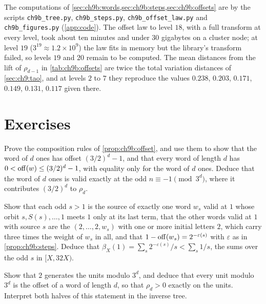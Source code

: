 \begin{sloppypar}The computations of \cref{sec:ch9b:words,sec:ch9b:steps,sec:ch9b:offsets} are by the scripts \texttt{ch9b\_tree.py}, \texttt{ch9b\_steps.py}, \texttt{ch9b\_offset\_law.py} and \texttt{ch9b\_figures.py} (\cref{app:code}). The offset law to level $18$, with a full transform at every level, took about ten minutes and under $30$ gigabytes on a cluster node; at level $19$ ($3^{19}\approx1.2\times10^9$) the law fits in memory but the library's transform failed, so levels $19$ and $20$ remain to be computed. The mean distances from the lift of $\rho_{d-1}$ in \cref{tab:ch9b:offsets} are twice the total variation distances of \cref{sec:ch9:tao}, and at levels $2$ to $7$ they reproduce the values $0.238$, $0.203$, $0.171$, $0.149$, $0.131$, $0.117$ given there.\end{sloppypar}

\section*{Exercises}

\begin{exercise}\label{ex:ch9b:ones}
Prove the composition rules of \cref{prop:ch9b:offset}, and use them to show that the word of $d$ ones has offset $(3/2)^d-1$, and that every word of length $d$ has $0<\operatorname{off}(w)\le(3/2)^d-1$, with equality only for the word of $d$ ones. Deduce that the word of $d$ ones is valid exactly at the odd $n\equiv-1\pmod{3^d}$, where it contributes $(3/2)^d$ to $\rho_d$.
\end{exercise}

\begin{exercise}\label{ex:ch9b:targetone}
Show that each odd $s>1$ is the source of exactly one word $w_s$ valid at $1$ whose orbit $s,S(s),\ldots,1$ meets $1$ only at its last term, that the other words valid at $1$ with source $s$ are the $(2,\ldots,2,w_s)$ with one or more initial letters $2$, which carry three times the weight of $w_s$ in all, and that $1-\operatorname{off}(w_s)=2^{-\varepsilon(s)}$ with $\varepsilon$ as in \cref{prop:ch9b:steps}. Deduce that $\beta_X(1)=\sum_s2^{-\varepsilon(s)}/s<\sum_s1/s$, the sums over the odd $s$ in $[X,32X)$.
\end{exercise}

\begin{exercise}\label{ex:ch9b:units}
Show that $2$ generates the units modulo $3^d$, and deduce that every unit modulo $3^d$ is the offset of a word of length $d$, so that $\rho_d>0$ exactly on the units. Interpret both halves of this statement in the inverse tree.
\end{exercise}

